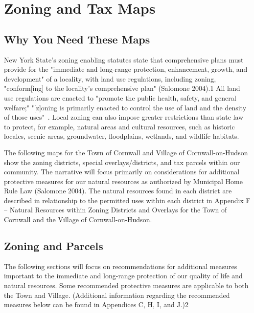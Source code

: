 \label{map:protectedopenspace}
\section{Zoning and Tax Maps}\label{subsec:zoning}
\subsection*{Why You Need These Maps}
New York State's zoning enabling statutes state that comprehensive plans must 
provide for the "immediate and long-range protection, enhancement, growth, and 
development" of a locality, with land use regulations, including zoning, 
"conform[ing] to the locality's comprehensive plan" (Salomone 2004).1 All land 
use regulations are enacted to "promote the public health, safety, and general 
welfare;" "[z]oning is primarily enacted to control the use of land and the 
density of those uses"~\citep{haeckel2014}.  Local zoning can also impose 
greater restrictions than state law to protect, for example, natural areas and 
cultural resources, such as historic locales, scenic areas, groundwater, 
floodplains, wetlands, and wildlife habitats.

The following maps for the Town of Cornwall and Village of Cornwall-on-Hudson 
show the zoning districts, special overlays/districts, and tax parcels within 
our community. The narrative will focus primarily on considerations for 
additional protective measures for our natural resources as authorized by 
Municipal Home Rule Law (Salomone 2004). The natural resources found in each 
district are described in relationship to the permitted uses within each 
district in Appendix F – Natural Resources within Zoning Districts and Overlays 
for the Town of Cornwall and the Village of Cornwall-on-Hudson.

\subsection*{Zoning and Parcels}
The following sections will focus on recommendations for additional measures 
important to the immediate and long-range protection of our quality of life and 
natural resources. Some recommended protective measures are applicable to both 
the Town and Village. (Additional information regarding the recommended 
measures below can be found in Appendices C, H, I, and J.)2

